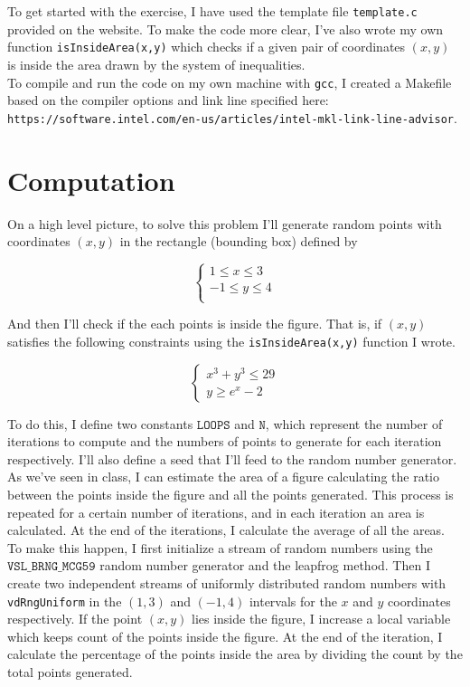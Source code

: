 \documentclass{article}
\newcommand{\code}{\texttt}
\begin{document}
To get started with the exercise, I have used the template file \code{template.c} provided on the website. To make the code more clear, I've also wrote my own function \code{isInsideArea(x,y)} which checks if a given pair of coordinates $(x, y)$ is inside the area drawn by the system of inequalities.\\

To compile and run the code on my own machine with \code{gcc}, I created a Makefile based on the compiler options and link line specified here:\\ \code{https://software.intel.com/en-us/articles/intel-mkl-link-line-advisor}.

\section{Computation}
On a high level picture, to solve this problem I'll generate random points with coordinates $(x, y)$ in the rectangle (bounding box) defined by

$$
\begin{cases}
1 \le x \le 3 \\
-1\le y \le 4 \\  
\end{cases}$$

And then I'll check if the each points is inside the figure. That is, if $(x, y)$ satisfies the following constraints using the \code{isInsideArea(x,y)} function I wrote.

$$
\begin{cases}
x^3+y^3\le 29 \\
y \ge e^x -2
\end{cases}$$

To do this, I define two constants $\code{LOOPS}$ and $\code{N}$, which represent the number of iterations to compute and the numbers of points to generate for each iteration respectively. I'll also define a seed that I'll feed to the random number generator.\\

As we've seen in class, I can estimate the area of a figure calculating the ratio between the points inside the figure and all the points generated. This process is repeated for a certain number of iterations, and in each iteration an area is calculated. At the end of the iterations, I calculate the average of all the areas.\\

To make this happen, I first initialize a stream of random numbers using the $\code{VSL\_BRNG\_MCG59}$ random number generator and the leapfrog method. Then I create two independent streams of uniformly distributed random numbers with \code{vdRngUniform} in the $(1,3)$ and $(-1,4)$ intervals for the $x$ and $y$ coordinates respectively. If the point $(x, y)$ lies inside the figure, I increase a local variable which keeps count of the points inside the figure. At the end of the iteration, I calculate the percentage of the points inside the area by dividing the count by the total points generated.\\
\end{document}
